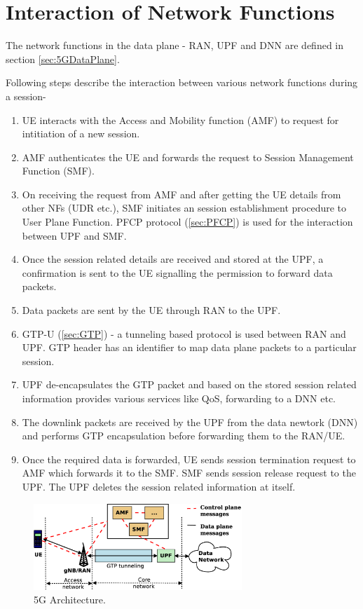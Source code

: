 \section{Interaction of Network Functions}
The network functions in the data plane - RAN, UPF and DNN are defined in section \ref{sec:5GDataPlane}.

Following steps describe the interaction between various network functions during a session-
\begin{enumerate}
	\item UE interacts with the Access and Mobility function (AMF) to request for intitiation of a new session.
	\item AMF authenticates the UE and forwards the request to Session Management Function (SMF).
	\item On receiving the request from AMF and after getting the UE details from other NFs (UDR etc.),
	SMF initiates an session establishment procedure to User Plane Function. PFCP protocol (\ref{sec:PFCP}) is used for the interaction between 
	UPF and SMF.
	\item Once the session related details are received and stored at the UPF, a confirmation is sent to the 
	UE signalling the permission to forward data packets. 
	\item Data packets are sent by the UE through RAN to the UPF. 
	\item GTP-U (\ref{sec:GTP}) - a tunneling based protocol is used between RAN and UPF. GTP header has an identifier to map data plane packets 
	to a particular session. 
	\item UPF de-encapsulates the GTP packet and based on the stored session 
	related information provides various services like QoS, forwarding to a DNN etc. 
	\item The downlink packets are received by the UPF from the data newtork (DNN) and performs GTP encapsulation before forwarding them to the RAN/UE.  	
	\item Once the required data is forwarded, UE sends session termination request to AMF which forwards it to the SMF. SMF sends session release request to the UPF. The UPF deletes the session related information  at itself. 
\end{enumerate}
 
\begin{figure}[htbp]
	\centering
       \includegraphics[width=0.7\textwidth]{fig/5g_arch.eps}
       \setlength{\belowcaptionskip}{-12pt}
	\caption{5G Architecture.}
	\label{fig:5g_arch}
       \end{figure}
       




